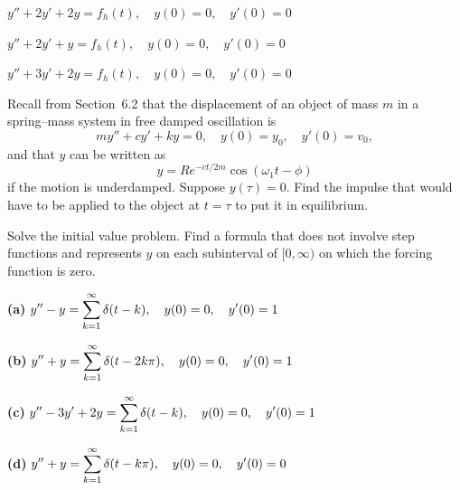 \begin{exerciselist}
  \item\label{exer:8.7.26} \Lex $y''+2y'+2y=f_{h}(t),\quad y(0)=0,\quad y'(0)=0$

  \item\label{exer:8.7.27} \Lex $y''+2y'+y=f_{h}(t),\quad y(0)=0,\quad y'(0)=0$

  \item\label{exer:8.7.28} \Lex $y''+3y'+2y=f_{h}(t),\quad y(0)=0,\quad y'(0)=0$

  \item\label{exer:8.7.29}

  Recall from Section~6.2 that the displacement of an object of mass $m$ in a spring--mass system in
  free damped oscillation is
  \[
    my''+cy'+ky=0,\quad y(0)=y_{0},\quad y'(0)=v_{0},
  \]
  and that $y$ can be written as
  \[
    y=Re^{-ct/2m}\cos(\omega_{1}t-\phi)
  \]
  if the motion is underdamped. Suppose $y(\tau)=0$. Find the impulse that would have to be applied
  to the object at $t=\tau$ to put it in equilibrium.

  \item\label{exer:8.7.30} Solve the initial value problem. Find a formula that does not involve
        step functions and represents $y$ on each subinterval of $[0,\infty)$ on which the forcing
        function is zero.

  {\bf (a)} $\displaystyle{y''-y=\sum_{k=1}^{\infty}\delta(t-k),\quad y(0)=0,\quad y'(0)=1}$

  {\bf (b)} $\displaystyle{y''+y=\sum_{k=1}^{\infty}\delta(t-2k\pi),\quad y(0)=0,\quad y'(0)=1}$

  {\bf (c)} $\displaystyle{y''-3y'+2y=\sum_{k=1}^{\infty}\delta(t-k),\quad y(0)=0,\quad y'(0)=1}$

  {\bf (d)} $\displaystyle{y''+y=\sum_{k=1}^{\infty}\delta(t-k\pi),\quad y(0)=0,\quad y'(0)=0}$
\end{exerciselist}
